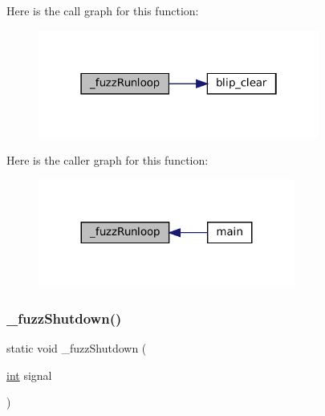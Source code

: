 Here is the call graph for this function\+:
\nopagebreak
\begin{figure}[H]
\begin{center}
\leavevmode
\includegraphics[width=262pt]{fuzz-main_8c_a2d0278ae741941374e0465b15af47d1d_cgraph}
\end{center}
\end{figure}
Here is the caller graph for this function\+:
\nopagebreak
\begin{figure}[H]
\begin{center}
\leavevmode
\includegraphics[width=239pt]{fuzz-main_8c_a2d0278ae741941374e0465b15af47d1d_icgraph}
\end{center}
\end{figure}
\mbox{\label{fuzz-main_8c_a4c46953207b5f03a88084e0d3918c9d1}} 
\subsubsection{\texorpdfstring{\+\_\+fuzz\+Shutdown()}{\_fuzzShutdown()}}
{\footnotesize\ttfamily static void \+\_\+fuzz\+Shutdown (\begin{DoxyParamCaption}\item[{\mbox{\hyperlink{ioapi_8h_a787fa3cf048117ba7123753c1e74fcd6}{int}}}]{signal }\end{DoxyParamCaption})\hspace{0.3cm}{\ttfamily [static]}}

